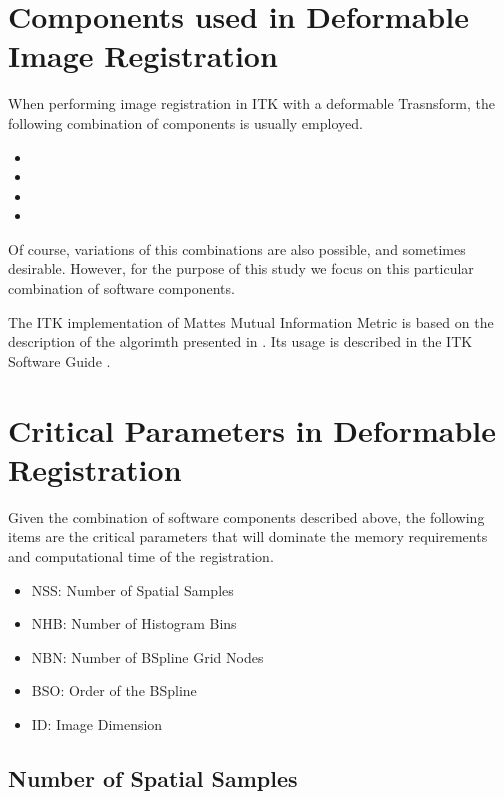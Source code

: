 \documentclass{InsightArticle}
\begin{document}
\section{Components used in Deformable Image Registration}

When performing image registration in ITK with a deformable Trasnsform, the
following combination of components is usually employed.

\begin{itemize}
\item {}
\item {}
\item {}
\item {}
\end{itemize}

Of course, variations of this combinations are also possible, and sometimes
desirable. However, for the purpose of this study we focus on this particular
combination of software components.

The ITK implementation of Mattes Mutual Information Metric is based on the
description of the algorimth presented in \cite{Mattes2001,Mattes2003}. Its
usage is described in the ITK Software Guide
\cite{ITKSoftwareGuideSecondEdition}.


\section{Critical Parameters in Deformable Registration}
\label{sec:CriticalParameters}

Given the combination of software components described above, the following
items are the critical parameters that will dominate the memory requirements
and computational time of the registration.

\begin{itemize}
\item NSS: Number of Spatial Samples
\item NHB: Number of Histogram Bins
\item NBN: Number of BSpline Grid Nodes
\item BSO: Order of the BSpline
\item ID:  Image Dimension
\end{itemize}

\subsection{Number of Spatial Samples}
\end{document}
